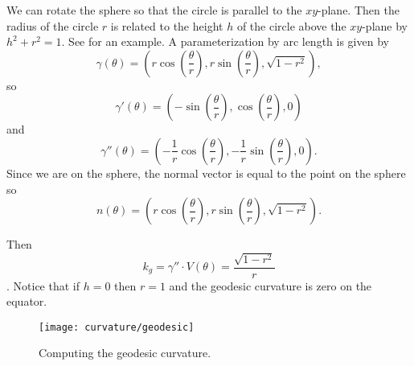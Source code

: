 \begin{example}\label{eqn:circles-on-sphere}
	We can rotate the sphere so that the circle is parallel to the $xy$-plane.
	Then the radius of the circle $r$ is related to the height $h$ of the circle above the $xy$-plane
	by $h^2+r^2=1$. See  for an example.
	A parameterization by arc length is given by
	$$\gamma(\theta)=\left(r\cos\left(\frac{\theta}{r}\right),r\sin\left(\frac{\theta}{r}\right),\sqrt{1-r^2}\right),$$
	so
	$$\gamma'(\theta)=\left(-\sin\left(\frac{\theta}{r}\right),\cos\left(\frac{\theta}{r}\right),0\right)$$
	and
	$$\gamma''(\theta)=\left(-\frac{1}{r}\cos\left(\frac{\theta}{r}\right),-\frac{1}{r}\sin\left(\frac{\theta}{r}\right),0\right).$$
	Since we are on the sphere, the normal vector is equal to the point on the sphere
	so $$n(\theta)=\left(r\cos\left(\frac{\theta}{r}\right),r\sin\left(\frac{\theta}{r}\right),\sqrt{1-r^2}\right).$$
	
	Then 
	$$k_g=\gamma''\cdot V(\theta)=\frac{\sqrt{1-r^2}}{r}$$.
	Notice that if $h=0$ then $r=1$ and the geodesic curvature is zero on the equator.
\end{example}

\begin{figure}[htb]
	\centering
	\texttt{[image: curvature/geodesic]}
	\caption{Computing the geodesic curvature.}
	\label{fig:geodesic}
\end{figure}
